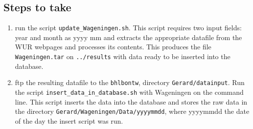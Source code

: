 \documentclass[a4paper]{article}
\begin{document}
\subsection*{Steps to take}

\begin{enumerate}
\item run the script \texttt{update\_Wageningen.sh}. This script requires two input fields: year and month
as yyyy mm and extracts the appropriate datafile from the WUR webpages and processes its contents. 
This produces the file \texttt{Wageningen.tar} on \texttt{../results} with data ready to be 
inserted into the database.
\item ftp the resulting datafile to the \texttt{bhlbontw},
directory \texttt{Gerard/datainput}. Run the script \texttt{insert\_data\_in\_database.sh} with Wageningen
on the command line. This script inserts the data into the database and stores the raw
data in the directory \texttt{Gerard/Wageningen/Data/yyyymmdd}, where yyyymmdd the date of the day the insert
script was run.
\end{enumerate}





\end{document}
